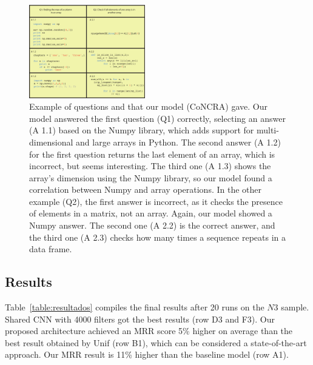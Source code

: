 \documentclass[sigconf]{acmart}
\begin{document}
\begin{figure}[h]
  \includegraphics[width=0.45\textwidth]{figuras/concrete_examples.pdf}
  \caption{Example of questions and  that our model (CoNCRA) gave. Our model answered the first question (Q1) correctly, selecting an answer (A 1.1) based on the Numpy library, which adds support for multi-dimensional and large arrays in Python. The second answer (A 1.2) for the first question returns the last element of an array, which is incorrect, but seems interesting. The third one (A 1.3) shows the array's dimension using the Numpy library, so our model found a correlation between Numpy and array operations. In the other example (Q2), the first answer is incorrect, as it checks the presence of elements in a matrix, not an array. Again, our model showed a Numpy answer. The second one (A 2.2) is the correct answer, and the third one (A 2.3) checks how many times a sequence repeats in a data frame. }
  \label{fig:concrete-examples}
\end{figure}

\subsection{Results}

Table~\ref{table:resultados} compiles the final results after 20 runs on the $N3$ sample. Shared CNN with 4000 filters got the best results (row D3 and F3). Our proposed architecture achieved an MRR score 5\% higher on average than the best result obtained by Unif (row B1), which can be considered a state-of-the-art approach. Our MRR result is 11\% higher than the baseline model (row A1). 
\end{document}
